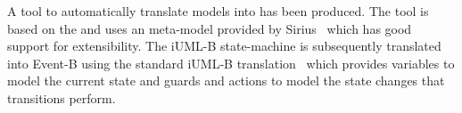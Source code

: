 
A tool to automatically translate \SCXML models into \iUMLB has been produced. 
The tool is based on the \EMF and uses an \SCXML meta-model provided by Sirius~\cite{siriuswebsite} which has good support for extensibility. 
The iUML-B state-machine is subsequently translated into Event-B using the standard iUML-B translation~\cite{snook14:_b_statem} which provides variables to model the current state and guards and actions to model the state changes that transitions perform.

